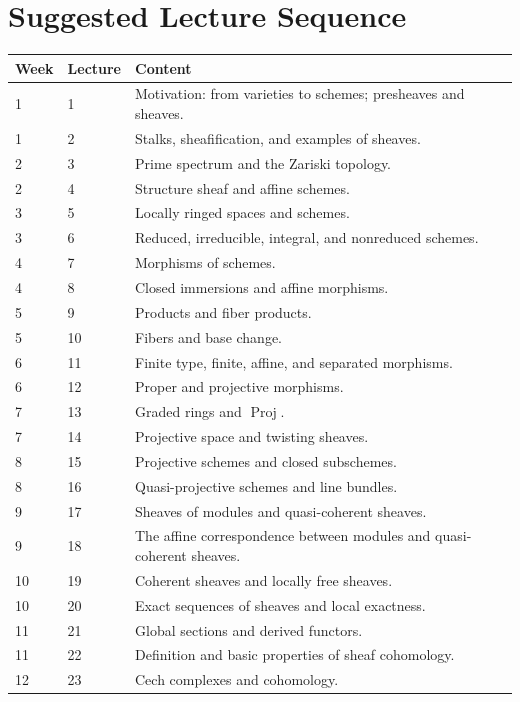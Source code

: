 \documentclass[11pt]{article}
\begin{document}
\section{Suggested Lecture Sequence}

\begin{longtable}{p{}p{}p{}}
\toprule
\textbf{Week} & \textbf{Lecture} & \textbf{Content} \\
\midrule
1 & 1 & Motivation: from varieties to schemes; presheaves and sheaves. \\
1 & 2 & Stalks, sheafification, and examples of sheaves. \\
2 & 3 & Prime spectrum and the Zariski topology. \\
2 & 4 & Structure sheaf and affine schemes. \\
3 & 5 & Locally ringed spaces and schemes. \\
3 & 6 & Reduced, irreducible, integral, and nonreduced schemes. \\
4 & 7 & Morphisms of schemes. \\
4 & 8 & Closed immersions and affine morphisms. \\
5 & 9 & Products and fiber products. \\
5 & 10 & Fibers and base change. \\
6 & 11 & Finite type, finite, affine, and separated morphisms. \\
6 & 12 & Proper and projective morphisms. \\
7 & 13 & Graded rings and $\operatorname{Proj}$. \\
7 & 14 & Projective space and twisting sheaves. \\
8 & 15 & Projective schemes and closed subschemes. \\
8 & 16 & Quasi-projective schemes and line bundles. \\
9 & 17 & Sheaves of modules and quasi-coherent sheaves. \\
9 & 18 & The affine correspondence between modules and quasi-coherent sheaves. \\
10 & 19 & Coherent sheaves and locally free sheaves. \\
10 & 20 & Exact sequences of sheaves and local exactness. \\
11 & 21 & Global sections and derived functors. \\
11 & 22 & Definition and basic properties of sheaf cohomology. \\
12 & 23 & Cech complexes and cohomology. \\

\end{longtable}
\end{document}
